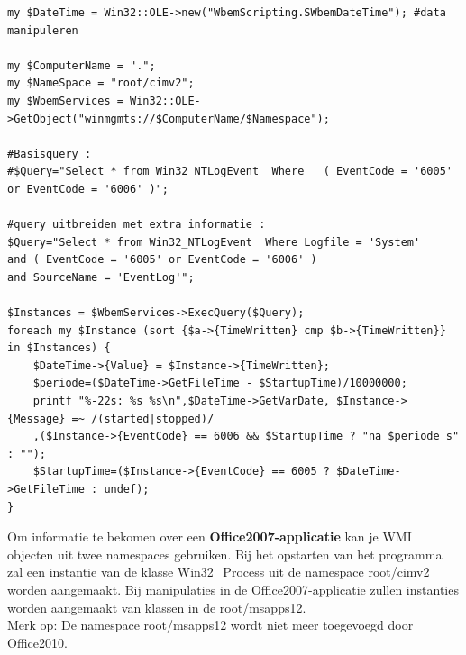 \documentclass[11pt,a4paper]{report}
\begin{document}
\begin{enumerate}[resume]
\begin{lstlisting}
my $DateTime = Win32::OLE->new("WbemScripting.SWbemDateTime"); #data manipuleren

my $ComputerName = ".";
my $NameSpace = "root/cimv2";
my $WbemServices = Win32::OLE->GetObject("winmgmts://$ComputerName/$Namespace");

#Basisquery :
#$Query="Select * from Win32_NTLogEvent  Where   ( EventCode = '6005' or EventCode = '6006' )";

#query uitbreiden met extra informatie :
$Query="Select * from Win32_NTLogEvent  Where Logfile = 'System'
and ( EventCode = '6005' or EventCode = '6006' )
and SourceName = 'EventLog'";

$Instances = $WbemServices->ExecQuery($Query);
foreach my $Instance (sort {$a->{TimeWritten} cmp $b->{TimeWritten}} in $Instances) {
	$DateTime->{Value} = $Instance->{TimeWritten};
	$periode=($DateTime->GetFileTime - $StartupTime)/10000000;
	printf "%-22s: %s %s\n",$DateTime->GetVarDate, $Instance->{Message} =~ /(started|stopped)/
	,($Instance->{EventCode} == 6006 && $StartupTime ? "na $periode s" : "");
	$StartupTime=($Instance->{EventCode} == 6005 ? $DateTime->GetFileTime : undef);
}
	\end{lstlisting}
\end{enumerate}
Om informatie te bekomen over een \textbf{Office2007-applicatie} kan je WMI objecten uit twee namespaces gebruiken. Bij het opstarten van het programma zal een instantie van de klasse Win32\_Process uit de namespace root/cimv2 worden aangemaakt. Bij manipulaties in de Office2007-applicatie zullen instanties worden aangemaakt van klassen in de root/msapps12.
\\Merk op: De namespace root/msapps12 wordt niet meer toegevoegd door Office2010.
\end{document}
